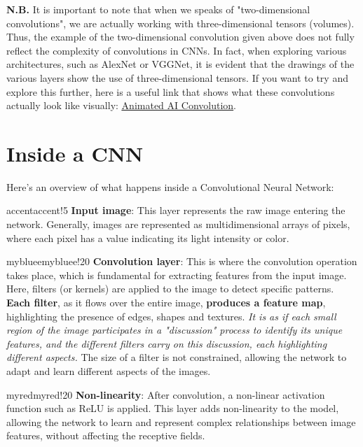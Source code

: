 \textbf{N.B.} It is important to note that when we speaks of "two-dimensional convolutions", we are actually working with three-dimensional tensors (volumes). Thus, the example of the two-dimensional convolution given above does not fully reflect the complexity of convolutions in CNNs. In fact, when exploring various architectures, such as AlexNet or VGGNet, it is evident that the drawings of the various layers show the use of three-dimensional tensors. If you want to try and explore this further, here is a useful link that shows what these convolutions actually look like visually: \underline{\href{https://animatedai.github.io/}{Animated AI Convolution}}.


\section{Inside a CNN}

Here's an overview of what happens inside a Convolutional Neural Network:  
\begin{remark}{accent}{accent!5}
\textbf{Input image}: This layer represents the raw image entering the network. Generally, images are represented as multidimensional arrays of pixels, where each pixel has a value indicating its light intensity or color.
\end{remark}

\begin{remark}{mybluee}{mybluee!20}
\textbf{Convolution layer}: This is where the convolution operation takes place, which is fundamental for extracting features from the input image. Here, filters (or kernels) are applied to the image to detect specific patterns. \textbf{Each filter}, as it flows over the entire image, \textbf{produces a feature map}, highlighting the presence of edges, shapes and textures. \textit{It is as if each small region of the image participates in a "discussion" process to identify its unique features, and the different filters carry on this discussion, each highlighting different aspects.} The size of a filter is not constrained, allowing the network to adapt and learn different aspects of the images.
\end{remark}


\begin{remark}{myred}{myred!20}
\textbf{Non-linearity}: After convolution, a non-linear activation function such as ReLU is applied. This layer adds non-linearity to the model, allowing the network to learn and represent complex relationships between image features, without affecting the
receptive fields. 
\end{remark}

